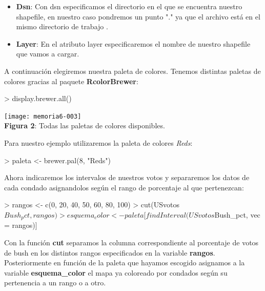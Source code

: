 \documentclass [a4paper] {article}
\begin{document}
\begin{itemize} 
  \item \textbf{Dsn}: Con dsn especificamos el directorio en el que se encuentra nuestro shapefile, en nuestro caso pondremos
  un punto "." ya que el archivo está en el mismo directorio de trabajo .
  \item \textbf{Layer}: En el atributo layer especificaremos el nombre de nuestro shapefile que vamos a cargar.
\end{itemize}

A continuación elegiremos nuestra paleta de colores. Tenemos distintas paletas de colores gracias al paquete \textbf{RcolorBrewer}:

\begin{center}
\begin{Schunk}
\begin{Sinput}
> display.brewer.all()
\end{Sinput}
\end{Schunk}
\texttt{[image: memoria6-003]}
\\\textbf{Figura 2}: Todas las paletas de colores disponibles.
\end{center}

Para nuestro ejemplo utilizaremos la paleta de colores \textit{Reds}:

\begin{Schunk}
\begin{Sinput}
> paleta <- brewer.pal(8, "Reds")
\end{Sinput}
\end{Schunk}

Ahora indicaremos los intervalos de nuestros votos y separaremos los datos de cada condado asignandolos según el rango de 
porcentaje al que pertenezcan:

\begin{Schunk}
\begin{Sinput}
> rangos <- c(0, 20, 40, 50, 60, 80, 100)
> cut(USvotos$Bush_pct, rangos)
> esquema_color <- paleta[findInterval(USvotos$Bush_pct, vec = rangos)]
\end{Sinput}
\end{Schunk}

Con la función \textbf{cut} separamos la columna correspondiente al porcentaje de votos de bush en los distintos rangos
especificados en la variable \textbf{rangos}.
Posteriormente en función de la paleta que hayamos escogido asignamos a la variable \textbf{esquema\_color} el mapa ya coloreado
por condados según su pertenencia a un rango o a otro.
\end{document}

